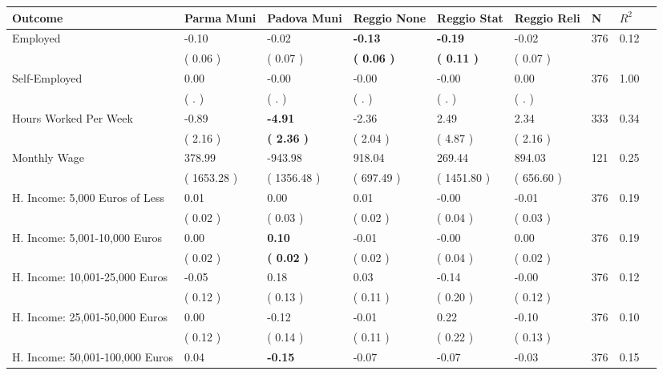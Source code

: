 \begin{tabular}{L{6.2cm} C{1.8cm} C{1.8cm} C{1.8cm} C{1.8cm} C{1.8cm} C{1.8cm} C{0.3cm} C{0.3cm}}
\toprule
 \textbf{Outcome} & \textbf{Parma Muni} & \textbf{Padova Muni} & \textbf{Reggio None} & \textbf{Reggio Stat} & \textbf{Reggio Reli} & \textbf{N} & \textbf{$ R^2$} \\
\midrule
Employed &     -0.10 &     -0.02 & \textbf{    -0.13} & \textbf{    -0.19} &     -0.02  & 376 &       0.12 \\ 
 & (     0.06 ) & (     0.07 ) & \textbf{(     0.06 )} & \textbf{(     0.11 )} & (     0.07 )  & \\
Self-Employed &      0.00 &     -0.00 &     -0.00 &     -0.00 &      0.00  & 376 &       1.00 \\ 
 & (        . ) & (        . ) & (        . ) & (        . ) & (        . )  & \\
Hours Worked Per Week &     -0.89 & \textbf{    -4.91} &     -2.36 &      2.49 &      2.34  & 333 &       0.34 \\ 
 & (     2.16 ) & \textbf{(     2.36 )} & (     2.04 ) & (     4.87 ) & (     2.16 )  & \\
Monthly Wage &    378.99 &   -943.98 &    918.04 &    269.44 &    894.03  & 121 &       0.25 \\ 
 & (  1653.28 ) & (  1356.48 ) & (   697.49 ) & (  1451.80 ) & (   656.60 )  & \\
H. Income: 5,000 Euros of Less &      0.01 &      0.00 &      0.01 &     -0.00 &     -0.01  & 376 &       0.19 \\ 
 & (     0.02 ) & (     0.03 ) & (     0.02 ) & (     0.04 ) & (     0.03 )  & \\
H. Income: 5,001-10,000 Euros &      0.00 & \textbf{     0.10} &     -0.01 &     -0.00 &      0.00  & 376 &       0.19 \\ 
 & (     0.02 ) & \textbf{(     0.02 )} & (     0.02 ) & (     0.04 ) & (     0.02 )  & \\
H. Income: 10,001-25,000 Euros &     -0.05 &      0.18 &      0.03 &     -0.14 &     -0.00  & 376 &       0.12 \\ 
 & (     0.12 ) & (     0.13 ) & (     0.11 ) & (     0.20 ) & (     0.12 )  & \\
H. Income: 25,001-50,000 Euros &      0.00 &     -0.12 &     -0.01 &      0.22 &     -0.10  & 376 &       0.10 \\ 
 & (     0.12 ) & (     0.14 ) & (     0.11 ) & (     0.22 ) & (     0.13 )  & \\
H. Income: 50,001-100,000 Euros &      0.04 & \textbf{    -0.15} &     -0.07 &     -0.07 &     -0.03  & 376 &       0.15 \\ 

\end{tabular}
